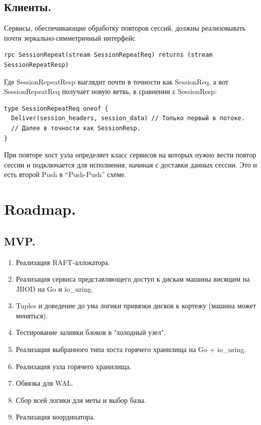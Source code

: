 \documentclass[a4paper,12pt]{article}
\begin{document}
\subsection{Клиенты.}

Сервисы, обеспечивающие обработку повторов сессий, должны реализовывать почти зеркально-симметричный интерфейс

\begin{lstlisting}
rpc SessionRepeat(stream SessionRepeatReq) returns (stream SessionRepeatResp)
\end{lstlisting}

Где SessionRepeatResp выглядит почти в точности как SessionReq, а вот SessionRepeatReq получает новую ветвь, в сравнении с SessionResp:

\begin{lstlisting}
type SessionRepeatReq oneof {
  Deliver(session_headers, session_data) // Только первый в потоке.
  // Далее в точности как SessionResp.
}
\end{lstlisting}

При повторе хост узла определяет класс сервисов на которых нужно вести повтор сессии и подключается для исполнения,
начиная с доставки данных сессии. Это и есть второй Push в \enquote{Push-Push} схеме.

\newpage
\section{Roadmap.}
\subsection{MVP.}

\begin{enumerate}
    \item Реализация RAFT-аллокатора.
    \item Реализация сервиса представляющего доступ к дискам машины висящим на JBOD на Go и io\_uring.
    \item Tuples и доведение до ума логики привязки дисков к кортежу (машина может меняться).
    \item Тестирование заливки блоков в "холодный узел".
    \item Реализация выбранного типа хоста горячего хранилища на Go + io\_uring.
    \item Реализация узла горячего хранилища.
    \item Обвязка для WAL.
    \item Сбор всей логики для меты и выбор базы.
    \item Реализация координатора.
\end{enumerate}
\end{document}
